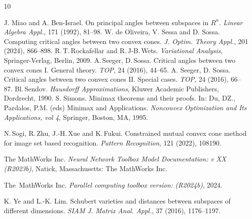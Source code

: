 \documentclass[hidelinks,onefignum,onetabnum]{siamart250211}
\theoremstyle{definition}
\theoremstyle{remark}
\begin{document}
\begin{thebibliography}{10}
{ J. Miao and A. Ben-Israel. On principal angles between subspaces in $R^n$. \emph{Linear Algebra Appl.}, 171 (1992), 81--98.
%
 W. de Oliveira, V. Sessa and D. Sossa. Computing critical angles between two convex cones. \emph{J. Optim. Theory Appl.}, 201 (2024), 866--898.
%
 R.\,T.\,Rockafellar and R.\,J-B.\,Wets. \emph{Variational Analysis}, Springer-Verlag, Berlin, 2009.
%
 A.\,Seeger, D.\,Sossa. Critical angles between two convex cones I. General theory. \emph{TOP}, 24 (2016), 44--65.
 A. Seeger, D. Sossa. Critical angles between two convex cones II. Special cases. \emph{TOP}, 24 (2016), 66--87.
%
 Bl.\,Sendov. \emph{Hausdorff Approximations}, Kluwer Academic Publishers, Dordrecht, 1990.
%
  S. Simons. Minimax theorems and their proofs. In: Du, DZ., Pardalos, P.M. (eds) Minimax and Applications. \emph{Nonconvex Optimization and Its Applications, vol 4}, Springer, Boston, MA, 1995. 
 

%
 N.\,Sogi, R.\,Zhu, J.-H.\,Xue and K.\,Fukui. Constrained mutual convex cone method for image set based recognition. \emph{Pattern Recognition}, 121 (2022), 108190.

 The MathWorks Inc. \emph{Neural Network Toolbox Model Documentation: v XX (R2023b)}, Natick, Massachusetts: The MathWorks Inc.


The~MathWorks Inc. \emph{Parallel computing toolbox version: ({R2024b})}, 2024. 



 K. Ye and L.-K. Lim. Schubert varieties and distances between subspaces of different dimensions. \emph{SIAM J. Matrix Anal. Appl.}, 37 (2016), 1176--1197.


%






}
\end{thebibliography}
%
\end{document}

